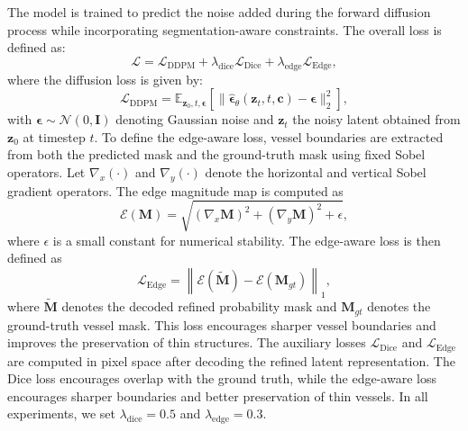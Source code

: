 \documentclass[journal,article,submit,pdftex,moreauthors]{Definitions/mdpi}
\begin{document}
The model is trained to predict the noise added during the forward diffusion process while incorporating segmentation-aware constraints. The overall loss is defined as:
\begin{equation}
\mathcal{L}=
\mathcal{L}_{\text{DDPM}}+
\lambda_{\text{dice}}\mathcal{L}_{\text{Dice}}+
\lambda_{\text{edge}}\mathcal{L}_{\text{Edge}},
\end{equation}
where the diffusion loss is given by:
\begin{equation}
\mathcal{L}_{\text{DDPM}}=
\mathbb{E}_{\mathbf{z}_0,t,\boldsymbol{\epsilon}}\left[
\|\hat{\boldsymbol{\epsilon}}_\theta(\mathbf{z}_t,t,\mathbf{c})-\boldsymbol{\epsilon}\|_2^2
\right],
\end{equation}
with $\boldsymbol{\epsilon}\sim\mathcal{N}(0,\mathbf{I})$ denoting Gaussian noise and $\mathbf{z}_t$ the noisy latent obtained from $\mathbf{z}_0$ at timestep $t$.
To define the edge-aware loss, vessel boundaries are extracted from both the predicted mask and the ground-truth mask using fixed Sobel operators. Let $\nabla_x(\cdot)$ and $\nabla_y(\cdot)$ denote the horizontal and vertical Sobel gradient operators. The edge magnitude map is computed as
\begin{equation}
\mathcal{E}(\mathbf{M}) =
\sqrt{
\left(\nabla_x \mathbf{M}\right)^2 +
\left(\nabla_y \mathbf{M}\right)^2 + \epsilon
},
\end{equation}
where $\epsilon$ is a small constant for numerical stability. The edge-aware loss is then defined as
\begin{equation}
\mathcal{L}_{\text{Edge}} =
\left\|
\mathcal{E}(\tilde{\mathbf{M}}) -
\mathcal{E}(\mathbf{M}_{gt})
\right\|_1,
\end{equation}
where $\tilde{\mathbf{M}}$ denotes the decoded refined probability mask and $\mathbf{M}_{gt}$ denotes the ground-truth vessel mask. This loss encourages sharper vessel boundaries and improves the preservation of thin structures.
The auxiliary losses $\mathcal{L}_{\text{Dice}}$ and $\mathcal{L}_{\text{Edge}}$ are computed in pixel space after decoding the refined latent representation. The Dice loss encourages overlap with the ground truth, while the edge-aware loss encourages sharper boundaries and better preservation of thin vessels. In all experiments, we set $\lambda_{\text{dice}}=0.5$ and $\lambda_{\text{edge}}=0.3$.
\end{document}
